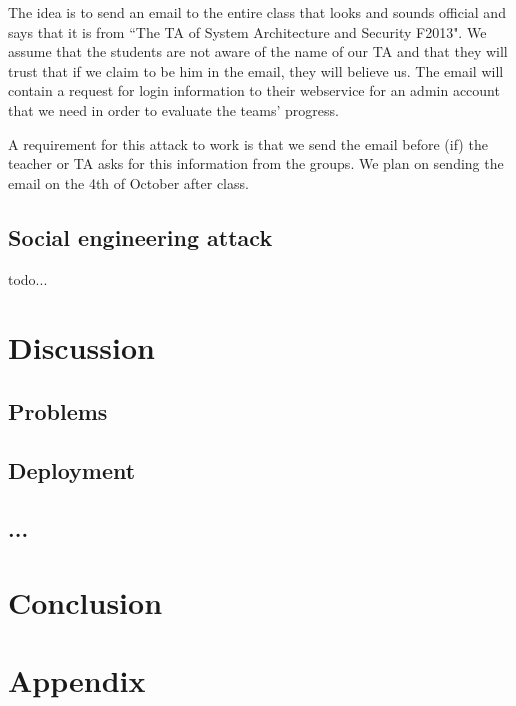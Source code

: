 \documentclass[a4paper]{article}
\begin{document}
The idea is to send an email to the entire class that looks and sounds official and says that it is from ``The TA of System Architecture and Security F2013". We assume that the students are not aware of the name of our TA and that they will trust that if we claim to be him in the email, they will believe us. The email will contain a request for login information to their webservice for an admin account that we need in order to evaluate the teams' progress.

A requirement for this attack to work is that we send the email before (if) the teacher or TA asks for this information from the groups. We plan on sending the email on the 4th of October after class.

\subsection{Social engineering attack}
todo...

\section{Discussion}
\subsection{Problems}
\subsection{Deployment}

\subsection{...}


\section{Conclusion}

\section{Appendix}

\end{document}
